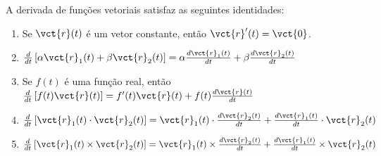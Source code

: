 \begin{teo} A derivada de funções vetoriais satisfaz as seguintes identidades:
\begin{enumerate}
\item Se $\vct{r}(t)$ é um vetor constante, então $\vct{r}'(t)=\vct{0}$. 
\item $\frac{d}{dt}\left[\alpha \vct{r}_1(t)+\beta \vct{r}_2(t)\right]=\alpha\frac{d\vct{r}_1(t)}{dt}+\beta\frac{d\vct{r}_2(t)}{dt}$
\item Se $f(t)$ é uma função real, então $\frac{d}{dt}\left[f(t) \vct{r}(t)\right]=f'(t)\vct{r}(t)+f(t)\frac{d\vct{r}(t)}{dt}$
\item $\frac{d}{dt}\left[\vct{r}_1(t)\cdot \vct{r}_2(t)\right]=\vct{r}_1(t)\cdot\frac{d\vct{r}_2(t)}{dt}+\frac{d\vct{r}_1(t)}{dt}\cdot\vct{r}_2(t)$
\item $\frac{d}{dt}\left[\vct{r}_1(t)\times \vct{r}_2(t)\right]=\vct{r}_1(t)\times\frac{d\vct{r}_2(t)}{dt}+\frac{d\vct{r}_1(t)}{dt}\times\vct{r}_2(t)$
\end{enumerate}
\end{teo}
